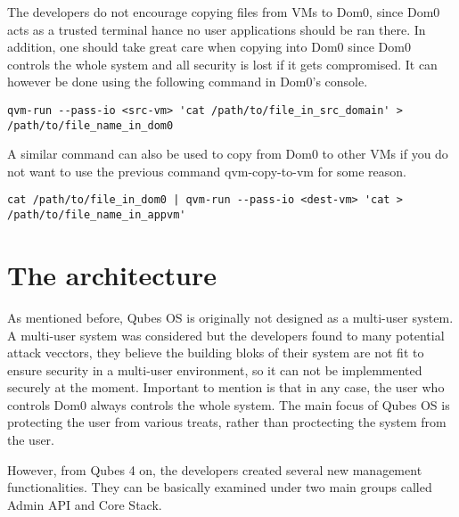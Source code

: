 \documentclass[runningheads,a4paper]{article}
\begin{document}
The developers do not encourage copying files from VMs to Dom0, since
Dom0 acts as a trusted terminal hance no user applications should be
ran there.  In addition, one should take great care when copying into
Dom0 since Dom0 controls the whole system and all security is lost if
it gets compromised.  It can however be done using the following
command in Dom0's console.  
\begin{verbatim}
qvm-run --pass-io <src-vm> 'cat /path/to/file_in_src_domain' > /path/to/file_name_in_dom0 
\end{verbatim} 
 A similar command can also be used to copy from Dom0 to other VMs if
you do not want to use the previous command qvm-copy-to-vm for some
reason.  
\begin{verbatim}
cat /path/to/file_in_dom0 | qvm-run --pass-io <dest-vm> 'cat > /path/to/file_name_in_appvm'
\end{verbatim}

\section{The architecture}
As mentioned before, Qubes OS is originally not designed as a
multi-user system.  A multi-user system was considered but the
developers found to many potential attack vecctors, they believe the
building bloks of their system are not fit to ensure security in a
multi-user environment, so it can not be implemmented securely at the
moment. Important to mention is that in any case, the user who
controls Dom0 always controls the whole system. The main focus of
Qubes OS is protecting the user from various treats, rather than
proctecting the system from the user.

However, from Qubes 4 on, the developers created several new
management functionalities. They can be basically examined under two
main groups called Admin API and Core Stack.
\end{document}
